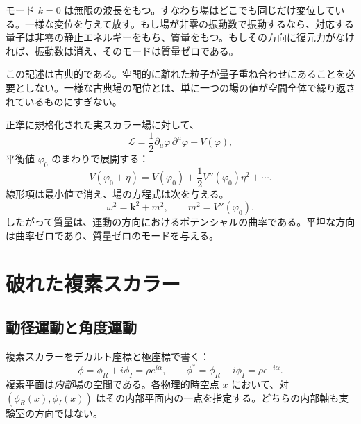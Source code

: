 モード \(k=0\) は無限の波長をもつ。すなわち場はどこでも同じだけ変位している。一様な変位を与えて放す。もし場が非零の振動数で振動するなら、対応する量子は非零の静止エネルギーをもち、質量をもつ。もしその方向に復元力がなければ、振動数は消え、そのモードは質量ゼロである。

この記述は古典的である。空間的に離れた粒子が量子重ね合わせにあることを必要としない。一様な古典場の配位とは、単に一つの場の値が空間全体で繰り返されているものにすぎない。

\begin{classroomqa}
\end{classroomqa}

正準に規格化された実スカラー場に対して、
\begin{equation}
  \mathcal L
  =\frac12\partial_\mu\varphi\,\partial^\mu\varphi-V(\varphi),
\end{equation}
平衡値 \(\varphi_0\) のまわりで展開する：
\begin{equation}
  V(\varphi_0+\eta)
  =V(\varphi_0)
   +\frac12V''(\varphi_0)\eta^2+\cdots.
\end{equation}
線形項は最小値で消え、場の方程式は次を与える。
\begin{equation}
  \omega^2=\bm{k}^2+m^2,
  \qquad
  m^2=V''(\varphi_0).
  \label{eq:l08-curvature-mass}
\end{equation}
したがって質量は、運動の方向におけるポテンシャルの曲率である。平坦な方向は曲率ゼロであり、質量ゼロのモードを与える。

\section{破れた複素スカラー}

\subsection{動径運動と角度運動}

複素スカラーをデカルト座標と極座標で書く：
\begin{equation}
  \phi=\phi_R+i\phi_I=\rho e^{i\alpha},
  \qquad
  \phi^*=\phi_R-i\phi_I=\rho e^{-i\alpha}.
  \label{eq:l08-polar-field}
\end{equation}
複素平面は\emph{内部}場の空間である。各物理的時空点 \(x\) において、対
\((\phi_R(x),\phi_I(x))\) はその内部平面内の一点を指定する。どちらの内部軸も実験室の方向ではない。

